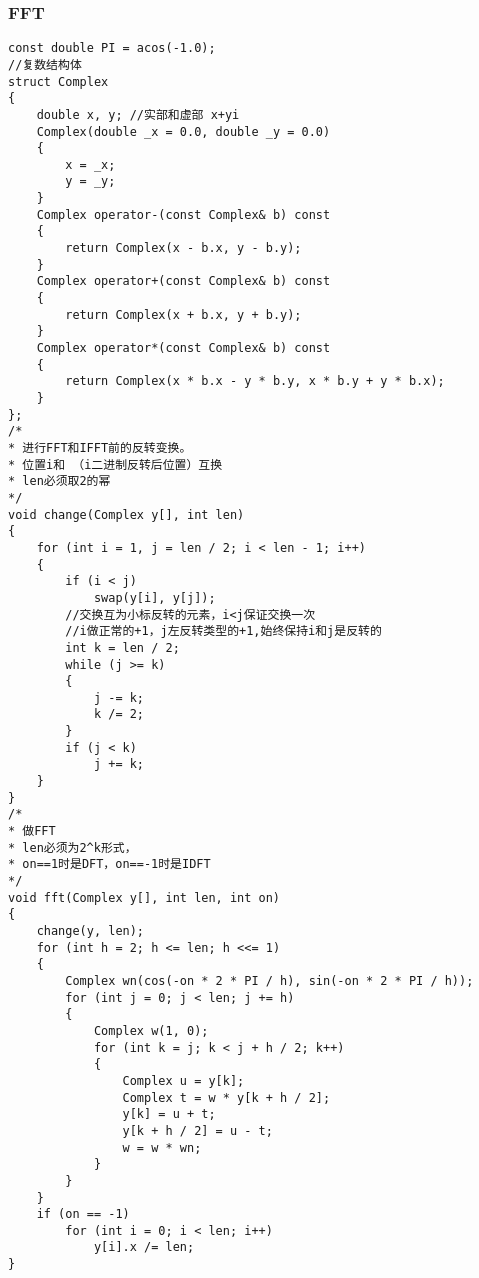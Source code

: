 \documentclass[a4]{article}
\begin{document}
\subsubsection{FFT}
\begin{lstlisting}
const double PI = acos(-1.0);
//复数结构体
struct Complex
{
    double x, y; //实部和虚部 x+yi
    Complex(double _x = 0.0, double _y = 0.0)
    {
        x = _x;
        y = _y;
    }
    Complex operator-(const Complex& b) const
    {
        return Complex(x - b.x, y - b.y);
    }
    Complex operator+(const Complex& b) const
    {
        return Complex(x + b.x, y + b.y);
    }
    Complex operator*(const Complex& b) const
    {
        return Complex(x * b.x - y * b.y, x * b.y + y * b.x);
    }
};
/*
* 进行FFT和IFFT前的反转变换。
* 位置i和 （i二进制反转后位置）互换
* len必须取2的幂
*/
void change(Complex y[], int len)
{
    for (int i = 1, j = len / 2; i < len - 1; i++)
    {
        if (i < j)
            swap(y[i], y[j]);
        //交换互为小标反转的元素，i<j保证交换一次
        //i做正常的+1，j左反转类型的+1,始终保持i和j是反转的
        int k = len / 2;
        while (j >= k)
        {
            j -= k;
            k /= 2;
        }
        if (j < k)
            j += k;
    }
}
/*
* 做FFT
* len必须为2^k形式，
* on==1时是DFT，on==-1时是IDFT
*/
void fft(Complex y[], int len, int on)
{
    change(y, len);
    for (int h = 2; h <= len; h <<= 1)
    {
        Complex wn(cos(-on * 2 * PI / h), sin(-on * 2 * PI / h));
        for (int j = 0; j < len; j += h)
        {
            Complex w(1, 0);
            for (int k = j; k < j + h / 2; k++)
            {
                Complex u = y[k];
                Complex t = w * y[k + h / 2];
                y[k] = u + t;
                y[k + h / 2] = u - t;
                w = w * wn;
            }
        }
    }
    if (on == -1)
        for (int i = 0; i < len; i++)
            y[i].x /= len;
}
\end{lstlisting}
\end{document}
